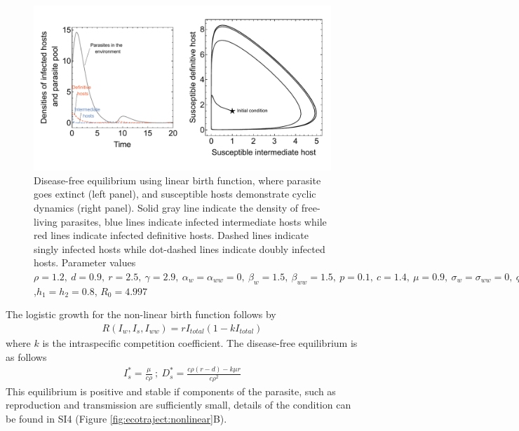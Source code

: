 \documentclass[a4paper]{scrartcl}
\begin{document}
\begin{figure}[!ht]
\includegraphics[width=\textwidth]{Figures/diseasefree_linear.pdf}
\caption{Disease-free equilibrium using linear birth function, where parasite goes extinct (left panel), and susceptible hosts demonstrate cyclic dynamics (right panel). Solid gray line indicate the density of free-living parasites, blue lines indicate infected intermediate hosts while red lines indicate infected definitive hosts. Dashed lines indicate singly infected hosts while dot-dashed lines indicate doubly infected hosts. Parameter values  $\rho = 1.2, \  d = 0.9, \  r = 2.5, \ \gamma = 2.9, \ \alpha_w =  \alpha_{ww} =  0, \ \beta_w  = 1.5, \ \beta_{ww} = 1.5, \ p = 0.1,  \ c = 1.4, \ \mu = 0.9,  \ \sigma_w = \sigma_{ww} = 0, \ q = 0.01, \  f_w = 6.5, \  f_{ww} = 7.5, \ \delta = 0.9$,$h_1 = h_2 = 0.8$, $R_0 = 4.997$ } 
\label{fig:diseasefree:linear}
\end{figure}

The logistic growth for the non-linear birth function follows by 
%
\begin{align*}
R(I_w, I_s,I_{ww}) = r I_{total} (1 - k I_{total})
\end{align*}
%
where $k$ is the intraspecific competition coefficient. 
The disease-free equilibrium is as follows
%
\begin{align*}
I_s^* = \frac{\mu}{c \rho } \ ;\  D_s^* = \frac{c \rho  (r-d) - k \mu  r}{c \rho ^2}
\end{align*}
%
This equilibrium is positive and stable if components of the parasite, such as reproduction and transmission are sufficiently small, details of the condition can be found in SI4
(Figure \ref{fig:ecotraject:nonlinear}B).
\end{document}
